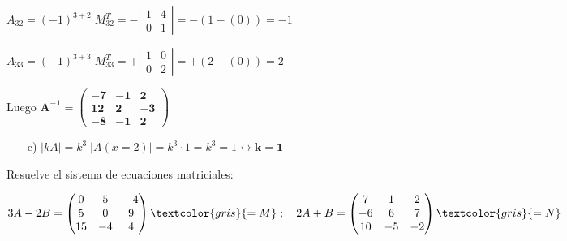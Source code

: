 \begin{proofw}
\noindent $A_{32}=(-1)^{3+2}\; M^T_{32}=- \left| \begin{matrix} 1&4\\0&1  \end{matrix} \right|=- ( 1-(0) )=-1 $

\noindent $A_{33}=(-1)^{3+3}\; M^T_{33}=+ \left| \begin{matrix} 1&0\\0&2 \end{matrix} \right|=+ (2 -(0) )=2 $

Luego $\boldsymbol{ A^{-1}=\left( \begin{matrix}-7&-1&2\\12&2&-3\\-8&-1&2  \end{matrix} \right)}$

\noindent ----- c) $|kA|=k^3\;|A(x=2)|=k^3\cdot 1=k^3=1 \leftrightarrow \boldsymbol{k=1}$

\end{proofw}



\begin{ejre}
Resuelve el sistema de ecuaciones matriciales:

$3A-2B=	 \left( \begin{matrix} 0&5&-4\\5&0&9\\15&-4&4  \end{matrix} \right)\textcolor{gris}{=M}\; ; \quad 
2A+B= \left( \begin{matrix} 7&1&2\\-6&6&7\\10&-5&-2   \end{matrix} \right) \textcolor{gris}{=N}$
\end{ejre}

